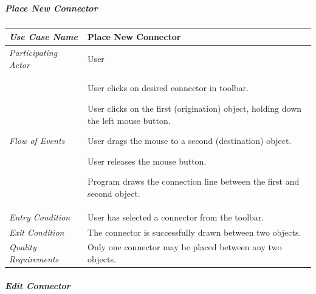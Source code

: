 \documentclass[twoside,letterpaper]{article}
\newenvironment{my_enumerate}{
\begin{enumerate}
  \setlength{\itemsep}{1pt}
  \setlength{\parskip}{0pt}
  \setlength{\parsep}{0pt}}{\end{enumerate}
}
\begin{document}

\subparagraph[\ Place New Connector ] 
{\bfseries Place New Connector }

\begin{flushleft}
\tablehead{}
\begin{tabular}{|m{2.0in} m{5.0in}|}
\hline 
  {\bfseries\emph{Use Case Name}} 
  & {\bfseries Place New Connector}
\\\hline
  \emph{Participating Actor} 
  & User
\\\hline
\emph{Flow of Events}
& \begin{my_enumerate}
\item User clicks on desired connector in toolbar.
\item User clicks on the first (origination) object, holding down the left mouse button.
\item User drags the mouse to a second (destination) object.
\item User releases the mouse button.
\item Program draws the connection line between the first and second object.
\end{my_enumerate}
\\\hline
  \emph{Entry Condition}
  & User has selected a connector from the toolbar.
\\\hline
  \emph{Exit Condition}
  & The connector is successfully drawn between two objects. 
\\\hline
  \emph{Quality Requirements}
  & Only one connector may be placed between any two objects.
\\\hline
\end{tabular}
\end{flushleft}
\bigskip



\clearpage

\subparagraph[\ Edit Connector ] 
{\bfseries Edit Connector }
\end{document}
